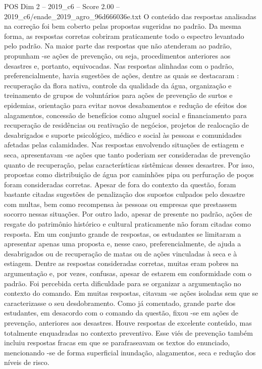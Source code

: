 \begin{textsample}{POS Dim 2 – 2019\_c6 – Score 2.00 – 2019\_c6/enade\_2019\_agro\_96d666036e.txt}
O conteúdo das respostas analisadas na correção foi bem coberto pelas propostas sugeridas no padrão.
Da mesma forma, as respostas corretas cobriram praticamente todo o espectro levantado pelo padrão.
Na maior parte das respostas que não atenderam ao padrão, propunham -se ações de prevenção, ou seja, procedimentos anteriores aos desastres e, portanto, equivocadas.
Nas respostas alinhadas com o padrão, preferencialmente, havia sugestões de ações, dentre as quais se destacaram : recuperação da flora nativa, controle da qualidade da água, organização e treinamento de grupos de voluntários para ações de prevenção de surtos e epidemias, orientação para evitar novos desabamentos e redução de efeitos dos alagamentos, concessão de benefícios como aluguel social e financiamento para recuperação de residências ou reativação de negócios, projetos de realocação de desabrigados e suporte psicológico, médico e social às pessoas e comunidades afetadas pelas calamidades.
Nas respostas envolvendo situações de estiagem e seca, apresentavam -se ações que tanto poderiam ser consideradas de prevenção quanto de recuperação, pelas características sistêmicas desses desastres.
Por isso, propostas como distribuição de água por caminhões pipa ou perfuração de poços foram consideradas corretas.
Apesar de fora do contexto da questão, foram bastante citadas sugestões de penalização dos supostos culpados pelo desastre com multas, bem como recompensa às pessoas ou empresas que prestassem socorro nessas situações.
Por outro lado, apesar de presente no padrão, ações de resgate do patrimônio histórico e cultural praticamente não foram citadas como resposta.
Em um conjunto grande de respostas, os estudantes se limitaram a apresentar apenas uma proposta e, nesse caso, preferencialmente, de ajuda a desabrigados ou de recuperação de matas ou de ações vinculadas à seca e à estiagem.
Dentre as respostas consideradas corretas, muitas eram pobres na argumentação e, por vezes, confusas, apesar de estarem em conformidade com o padrão.
Foi percebida certa dificuldade para se organizar a argumentação no contexto do comando.
Em muitas respostas, citavam -se ações isoladas sem que se caracterizasse o seu desdobramento.
Como já comentado, grande parte dos estudantes, em desacordo com o comando da questão, fixou -se em ações de prevenção, anteriores aos desastres.
Houve respostas de excelente conteúdo, mas totalmente enquadradas no contexto preventivo.
Esse viés de prevenção também incluiu respostas fracas em que se parafraseavam os textos do enunciado, mencionando -se de forma superficial inundação, alagamentos, seca e redução dos níveis de risco.

\end{textsample}
